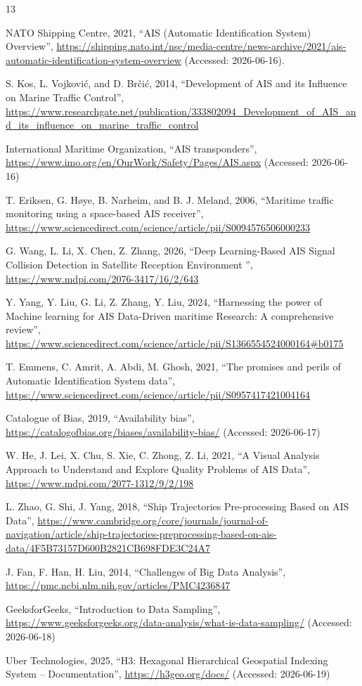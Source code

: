 \documentclass[10pt,a4paper]{article}
\begin{document}
\begin{thebibliography}{13}

NATO Shipping Centre, 2021,
``AIS (Automatic Identification System) Overview'',
\url{https://shipping.nato.int/nsc/media-centre/news-archive/2021/ais-automatic-identification-system-overview}
(Accessed: 2026-06-16).

S. Kos, L. Vojkovi{\'c}, and D. Br{\v{c}}i{\'c}, 2014,
``Development of AIS and its Influence on Marine Traffic Control'',
\url{https://www.researchgate.net/publication/333802094_Development_of_AIS_and_its_influence_on_marine_traffic_control}

International Maritime Organization,
``AIS transponders'',
\url{https://www.imo.org/en/OurWork/Safety/Pages/AIS.aspx}
(Accessed: 2026-06-16)

T. Eriksen, G. H{\o}ye, B. Narheim, and B. J. Meland, 2006,
``Maritime traffic monitoring using a space-based AIS receiver'',
\url{https://www.sciencedirect.com/science/article/pii/S0094576506000233}

G. Wang, L. Li, X. Chen, Z. Zhang, 2026,
``Deep Learning-Based AIS Signal Collision Detection in Satellite Reception Environment '',
\url{https://www.mdpi.com/2076-3417/16/2/643}

Y. Yang, Y. Liu, G. Li, Z. Zhang, Y. Liu, 2024,
``Harnessing the power of Machine learning for AIS Data-Driven maritime Research: A comprehensive review'',
\url{https://www.sciencedirect.com/science/article/pii/S1366554524000164\#b0175}

T. Emmens, C. Amrit, A. Abdi, M. Ghosh, 2021,
``The promises and perils of Automatic Identification System data'',
\url{https://www.sciencedirect.com/science/article/pii/S0957417421004164}

Catalogue of Bias, 2019,
``Availability bias'',
\url{https://catalogofbias.org/biases/availability-bias/}
(Accessed: 2026-06-17)

W. He, J. Lei, X. Chu, S. Xie, C. Zhong, Z. Li, 2021,
``A Visual Analysis Approach to Understand and Explore Quality Problems of AIS Data'',
\url{https://www.mdpi.com/2077-1312/9/2/198}

L. Zhao, G. Shi, J. Yang, 2018,
``Ship Trajectories Pre-processing Based on AIS Data'',
\url{https://www.cambridge.org/core/journals/journal-of-navigation/article/ship-trajectories-preprocessing-based-on-ais-data/4F5B73157D600B2821CB698FDE3C24A7}

J. Fan, F. Han, H. Liu, 2014,
``Challenges of Big Data Analysis'',
\url{https://pmc.ncbi.nlm.nih.gov/articles/PMC4236847}

GeeksforGeeks,
``Introduction to Data Sampling'',
\url{https://www.geeksforgeeks.org/data-analysis/what-is-data-sampling/}
(Accessed: 2026-06-18)

Uber Technologies, 2025,
``H3: Hexagonal Hierarchical Geospatial Indexing System -- Documentation'',
\url{https://h3geo.org/docs/}
(Accessed: 2026-06-19)

\end{thebibliography}
\end{document}
